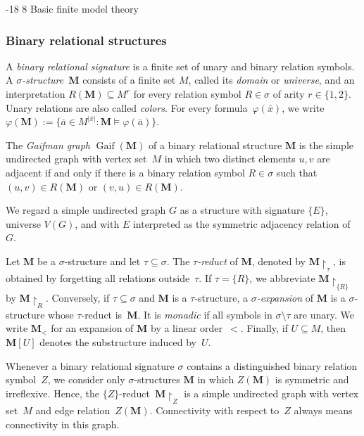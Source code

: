\documentclass[1p,number,11pt]{elsarticle}
\makeatletter
\renewcommand\subsection{\@startsection{subsection}{2}{\z@}%
  {-18\p@ \@plus -4\p@ \@minus -4\p@}%
  {8\p@ \@plus 4\p@ \@minus 4\p@}%
  {\normalfont\normalsize\bfseries}}
\newcommand{\Gaif}{\operatorname{Gaif}}
\theoremstyle{plain}
\newcommand{\MZ}{\mathbf M\!\upharpoonright_Z}
\makeatother
\begin{document}
\subsection{Basic finite model theory}
\subsubsection{Binary relational structures}

A \emph{binary relational signature} is a finite set of unary and binary relation symbols.  A \mbox{\emph{$\sigma$-structure}~$\mathbf M$} consists of a
finite set $M$, called its \emph{domain} or \emph{universe}, and an
interpretation \mbox{$R({\mathbf M})\subseteq M^r$} for every relation symbol
$R\in\sigma$ of arity $r\in\{1,2\}$.  Unary relations are also called
\emph{colors}. 
For every formula~$\varphi(\bar x)$, we write $\varphi(\mathbf M)
   :=\{\bar a\in M^{|\bar x|}:\mathbf M\models\varphi(\bar a)\}$.

The \emph{Gaifman graph} $\Gaif(\mathbf M)$ of a binary relational structure
$\mathbf M$ is the simple undirected graph with vertex set~$M$ in which two
distinct elements $u,v$ are adjacent if and only if there is a binary relation
symbol $R\in\sigma$ such that $(u,v)\in R({\mathbf M})$ or
$(v,u)\in R({\mathbf M})$.  

We regard a simple undirected graph $G$ as a structure with signature $\{E\}$,
universe $V(G)$, and with $E$ interpreted as the symmetric adjacency relation
of~$G$. 

Let $\mathbf M$ be a $\sigma$-structure and let $\tau\subseteq\sigma$.
The \emph{$\tau$-reduct} of $\mathbf M$, denoted by
$\mathbf M\!\upharpoonright_{\tau}$, is obtained by forgetting all relations
outside~$\tau$. If $\tau=\{R\}$, we abbreviate
$\mathbf M\!\upharpoonright_{\{R\}}$ by
$\mathbf M\!\upharpoonright_R$. Conversely, if
$\tau\subseteq\sigma$ and $\mathbf M$ is a $\tau$-structure, a
\emph{$\sigma$-expansion} of $\mathbf M$ is a $\sigma$-structure whose
$\tau$-reduct is~$\mathbf M$.  It is \emph{monadic} if all symbols in
$\sigma\setminus\tau$ are unary.  We write $\mathbf M_<$ for an expansion of
$\mathbf M$ by a linear order~$<$.  Finally, if $U\subseteq M$, then
$\mathbf M[U]$ denotes the substructure induced by~$U$.

Whenever a binary relational signature $\sigma$ contains a distinguished
binary relation symbol~$Z$, we consider only $\sigma$-structures $\mathbf M$
in which $Z(\mathbf M)$ is symmetric and irreflexive. Hence, the
$\{Z\}$-reduct~$\MZ$ is a simple undirected graph with vertex set~$M$ and edge relation~$Z(\mathbf M)$. Connectivity with
respect to~$Z$ always means connectivity in this graph.
\end{document}
